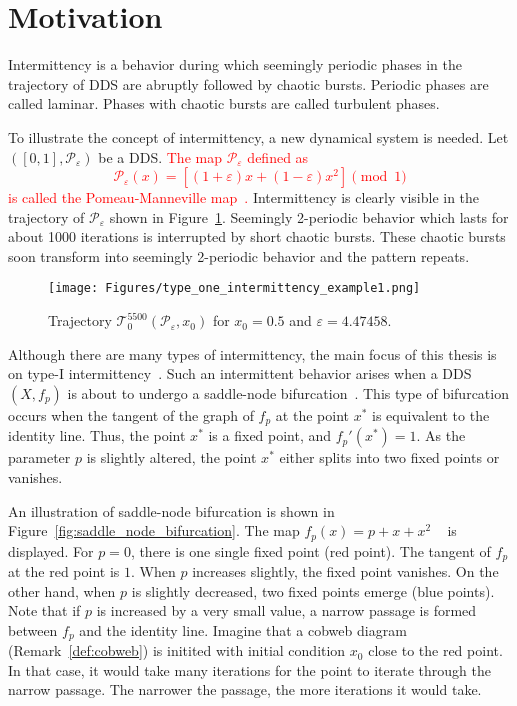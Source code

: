 \section{Motivation}
Intermittency is a behavior during which seemingly periodic phases in the trajectory of DDS are abruptly followed by chaotic bursts.
Periodic phases are called laminar.
Phases with chaotic bursts are called turbulent phases.
\par
To illustrate the concept of intermittency, a new dynamical system is needed.
Let $([0, 1], \mathcal{P}_{\varepsilon})$ be a DDS.
\textcolor{red}{The map $\mathcal{P}_{\varepsilon}$ defined as 
\begin{equation}
    \mathcal{P}_{\varepsilon}(x) = \left[ (1+\varepsilon)x+(1-\varepsilon)x^2 \right] \pmod{1} \label{pommeau_manneville_map}
\end{equation}
is called the Pomeau-Manneville map~\cite{Manneville1980,Datseris2022}.}
Intermittency is clearly visible in the trajectory of $\mathcal{P}_{\varepsilon}$ shown in Figure~\ref{fig:intermittent_trajectory_example}.
Seemingly 2-periodic behavior which lasts for about 1000 iterations is interrupted by short chaotic bursts.
These chaotic bursts soon transform into seemingly 2-periodic behavior and the pattern repeats.

\begin{figure}[!h]
    \centering
    \texttt{[image: Figures/type\_one\_intermittency\_example1.png]}
    \caption{
        Trajectory $\mathcal{T}^{5500}_{0}(\mathcal{P}_{\varepsilon}, x_0)$ for $x_0 = 0.5$ and $\varepsilon = 4.47458$.
    }
    \label{fig:intermittent_trajectory_example}
\end{figure}

Although there are many types of intermittency, the main focus of this thesis is on type-I intermittency~\cite{Pomeau1980,Bussac1982,DelRio2014}.
Such an intermittent behavior arises when a DDS $(X, f_{p})$ is about to undergo a saddle-node bifurcation~\cite{Elaskar2017}.
This type of bifurcation occurs when the tangent of the graph of $f_{p}$ at the point $x^{*}$ is equivalent to the identity line.
Thus, the point $x^{*}$ is a fixed point, and $f_{p}'(x^{*}) = 1$.
As the parameter $p$ is slightly altered, the point $x^{*}$ either splits into two fixed points or vanishes.
\par
An illustration of saddle-node bifurcation is shown in Figure~\ref{fig:saddle_node_bifurcation}.
The map $f_{p}(x) = p + x + x^2$ ~\cite{Pomeau1980} is displayed.
For $p = 0$, there is one single fixed point (red point).
The tangent of $f_{p}$ at the red point is $1$.
When $p$ increases slightly, the fixed point vanishes.
On the other hand, when $p$ is slightly decreased, two fixed points emerge (blue points).
Note that if $p$ is increased by a very small value, a narrow passage is formed between $f_{p}$ and the identity line.
Imagine that a cobweb diagram (Remark~\ref{def:cobweb}) is initited with initial condition $x_0$ close to the red point.
In that case, it would take many iterations for the point to iterate through the narrow passage.
The narrower the passage, the more iterations it would take.

